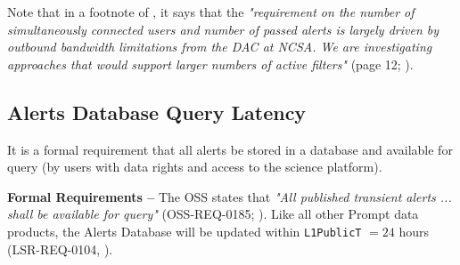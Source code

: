 \documentclass[DM,authoryear,toc]{lsstdoc}
\begin{document}
Note that in a footnote of , it says that the {\it "requirement on the number of simultaneously connected users and number of passed alerts is largely driven by outbound bandwidth limitations from the DAC at NCSA. We are investigating approaches that would support larger numbers of active filters"} (page 12; ).

\subsection{Alerts Database Query Latency}

It is a formal requirement that all alerts be stored in a database and available for query (by users with data rights and access to the science platform).

{\bf Formal Requirements --} The OSS states that {\it "All published transient alerts ... shall be available for query"} (OSS-REQ-0185; ). Like all other Prompt data products, the Alerts Database will be updated within {\tt L1PublicT} $=24$ hours (LSR-REQ-0104, ).


\clearpage


\end{document}

